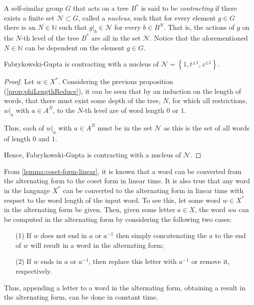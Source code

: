 A self-similar group $G$ that acts on a tree $B^\ast$ is said to be \emph{contracting} if there exists a finite set $\mathcal{N} \subset G$, called a \emph{nucleus}, such that for every element $g \in G$ there is an $N \in \mathbb{N}$ such that $\left. g \right\vert_b \in \mathcal{N}$ for every $b\in B^N$.
That is, the actions of $g$ on the $N$-th level of the tree $B^\ast$ are all in the set $\mathcal{N}$.
Notice that the aforementioned $N \in \mathbb{N}$ can be dependent on the element $g \in G$.

\begin{corollary}
	\label{cor:nucleus}
	Fabrykowski-Gupta is contracting with a nucleus of $\mathcal{N} = \left\lbrace 1, t^{\pm 1}, z^{\pm 1}\right\rbrace$.
\end{corollary}

\begin{proof}
	Let $w \in X^\ast$.
	Considering the previous proposition (\ref{prop:phiLengthReduce}), it can be seen that by an induction on the length of words, that there must exist some depth of the tree, $N$, for which all restrictions, $\left. w \right\vert_a$ with $a \in A^N$, to the $N$-th level are of word length $0$ or $1$.
	
	Thus, each of $\left. w \right\vert_a$ with $a\in A^N$ must be in the set $\mathcal{N}$ as this is the set of all words of length $0$ and $1$.
	
	Hence, Fabrykowski-Gupta is contracting with a nucleus of $\mathcal{N}$.
\end{proof}

From \cref{lemma:coset-form-linear}, it is known that a word can be converted from the alternating form to the coset form in linear time.
It is also true that any word in the language $X^\ast$ can be converted to the alternating form in linear time with respect to the word length of the input word.
To see this, let some word $w \in X^\ast$ in the alternating form be given.
Then, given some letter $a \in X$, the word $wa$ can be computed in the alternating form by considering the following two cases:
\begin{itemize}
	\item[(1)] If $w$ does not end in $a$ or $a^{-1}$ then simply concatenating the $a$ to the end of $w$ will result in a word in the alternating form;
	\item[(2)] If $w$ ends in $a$ or $a^{-1}$, then replace this letter with $a^{-1}$ or remove it, respectively.
\end{itemize}
Thus, appending a letter to a word in the alternating form, obtaining a result in the alternating form, can be done in constant time.

